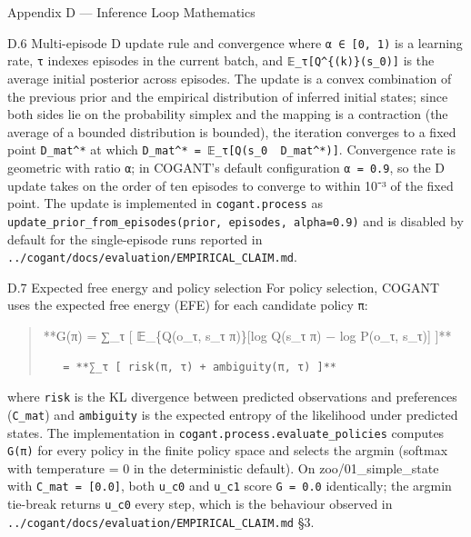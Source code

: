 \documentclass[
  ignorenonframetext,
]{beamer}
\begin{document}
\begin{frame}[fragile]{Appendix D --- Inference Loop Mathematics}
\begin{block}{D.6 Multi-episode D update rule and convergence}
where \texttt{α\ ∈\ {[}0,\ 1)} is a learning rate, \texttt{τ} indexes
episodes in the current batch, and \texttt{𝔼\_τ{[}Q\^{}\{(k)\}(s\_0){]}}
is the average initial posterior across episodes. The update is a convex
combination of the previous prior and the empirical distribution of
inferred initial states; since both sides lie on the probability simplex
and the mapping is a contraction (the average of a bounded distribution
is bounded), the iteration converges to a fixed point
\texttt{D\_mat\^{}*} at which
\texttt{D\_mat\^{}*\ =\ 𝔼\_τ{[}Q(s\_0\ \textbar{}\ D\_mat\^{}*){]}}.
Convergence rate is geometric with ratio \texttt{α}; in COGANT's default
configuration \texttt{α\ =\ 0.9}, so the D update takes on the order of
ten episodes to converge to within 10⁻³ of the fixed point. The update
is implemented in \texttt{cogant.process} as
\texttt{update\_prior\_from\_episodes(prior,\ episodes,\ alpha=0.9)} and
is disabled by default for the single-episode runs reported in
\texttt{../cogant/docs/evaluation/EMPIRICAL\_CLAIM.md}.
\end{block}

\begin{block}{D.7 Expected free energy and policy selection}
\protect{}\label{d.7-expected-free-energy-and-policy-selection}
For policy selection, COGANT uses the expected free energy (EFE) for
each candidate policy \texttt{π}:

\begin{quote}
**G(π) = ∑\_τ {[} 𝔼\_\{Q(o\_τ, s\_τ \textbar{} π)\}{[}log Q(s\_τ
\textbar{} π) − log P(o\_τ, s\_τ){]} {]}**

\begin{verbatim}
   = **∑_τ [ risk(π, τ) + ambiguity(π, τ) ]**
\end{verbatim}
\end{quote}

where \texttt{risk} is the KL divergence between predicted observations
and preferences (\texttt{C\_mat}) and \texttt{ambiguity} is the expected
entropy of the likelihood under predicted states. The implementation in
\texttt{cogant.process.evaluate\_policies} computes \texttt{G(π)} for
every policy in the finite policy space and selects the argmin (softmax
with temperature = 0 in the deterministic default). On
zoo/01\_simple\_state with \texttt{C\_mat\ =\ {[}0.0{]}}, both
\texttt{u\_c0} and \texttt{u\_c1} score \texttt{G\ =\ 0.0} identically;
the argmin tie-break returns \texttt{u\_c0} every step, which is the
behaviour observed in
\texttt{../cogant/docs/evaluation/EMPIRICAL\_CLAIM.md} §3.
\end{block}
\end{frame}

\begin{frame}
\end{frame}
\end{document}
